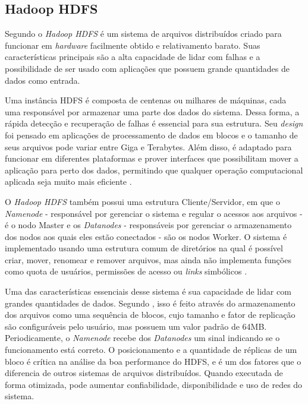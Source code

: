 \subsection{Hadoop HDFS}\label{ssec:hadoophdfs}

Segundo \textcite{HDFSDesign20} o \textit{Hadoop HDFS} é um sistema de arquivos distribuídos criado para funcionar em \textit{hardware} facilmente obtido e relativamento barato. Suas características principais são a alta capacidade de lidar com falhas e a possibilidade de ser usado com aplicações que possuem grande quantidades de dados como entrada.

Uma instância HDFS é composta de centenas ou milhares de máquinas, cada uma responsável por armazenar uma parte dos dados do sistema. Dessa forma, a rápida detecção e recuperação de falhas é essencial para sua estrutura. Seu \textit{design} foi pensado em aplicações de processamento de dados em blocos e o tamanho de seus arquivos pode variar entre Giga e Terabytes. Além disso, é adaptado para funcionar em diferentes plataformas e prover interfaces que possibilitam mover a aplicação para perto dos dados, permitindo que qualquer operação computacional aplicada seja muito mais eficiente \cite{HDFSDesign20}.

O \textit{Hadoop HDFS} também possui uma estrutura Cliente/Servidor, em que o \textit{Namenode} - responsável por gerenciar o sistema e regular o acessos aos arquivos - é o nodo Master e os \textit{Datanodes} - responsáveis por gerenciar o armazenamento dos nodos aos quais eles estão conectados - são os nodos Worker. O sistema é implementado usando uma estrutura comum de diretórios na qual é possível criar, mover, renomear e remover arquivos, mas ainda não implementa funções como quota de usuários, permissões de acesso ou \textit{links} simbólicos \cite{HDFSDesign20}.

Uma das características essenciais desse sistema é sua capacidade de lidar com grandes quantidades de dados. Segundo \textcite{HDFSDesign20}, isso é feito através do armazenamento dos arquivos como uma sequência de blocos, cujo tamanho e fator de replicação são configuráveis pelo usuário, mas possuem um valor padrão de 64MB. Periodicamente, o \textit{Namenode} recebe dos \textit{Datanodes} um sinal indicando se o funcionamento está correto. O posicionamento e a quantidade de réplicas de um bloco é crítica na análise da boa performance do HDFS, e é um dos fatores que o diferencia de outros sistemas de arquivos distribuídos. Quando executada de forma otimizada, pode aumentar confiabilidade, disponibilidade e uso de redes do sistema.



